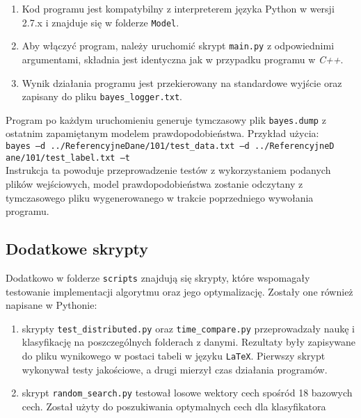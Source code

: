 \begin{enumerate}
	\item Kod programu jest kompatybilny z interpreterem języka Python w wersji 2.7.x i znajduje się w folderze \texttt{Model}.
	\item Aby włączyć program, należy uruchomić skrypt \texttt{main.py} z odpowiednimi argumentami, składnia jest identyczna jak w przypadku programu w \textit{C++}.
	\item Wynik działania programu jest przekierowany na standardowe wyjście oraz zapisany do pliku \texttt{bayes\_logger.txt}.
\end{enumerate}

Program po każdym uruchomieniu generuje tymczasowy plik \texttt{bayes.dump} z ostatnim zapamiętanym modelem prawdopodobieństwa. Przykład użycia:\\
\texttt{bayes --d ../ReferencyjneDane/101/test\_data.txt --d ../ReferencyjneD\\ane/101/test\_label.txt --t}\\ 
Instrukcja ta powoduje przeprowadzenie testów z wykorzystaniem podanych plików wejściowych, model prawdopodobieństwa zostanie odczytany z tymczasowego pliku wygenerowanego w trakcie poprzedniego wywołania programu.

\subsection{Dodatkowe skrypty}
\label{subsec_narzedzia}

Dodatkowo w folderze \texttt{scripts} znajdują się skrypty, które wspomagały testowanie implementacji algorytmu oraz jego optymalizację. Zostały one również napisane w Pythonie:

\begin{enumerate}
	\item skrypty \texttt{test\_distributed.py} oraz \texttt{time\_compare.py} przeprowadzały naukę i klasyfikację na poszczególnych folderach z danymi. Rezultaty były zapisywane do pliku wynikowego w postaci tabeli w języku \texttt{LaTeX}. Pierwszy skrypt wykonywał testy jakościowe, a drugi mierzył czas działania programów.
	\item skrypt \texttt{random\_search.py} testował losowe wektory cech spośród 18 bazowych cech. Został użyty do poszukiwania optymalnych cech dla klasyfikatora
\end{enumerate}